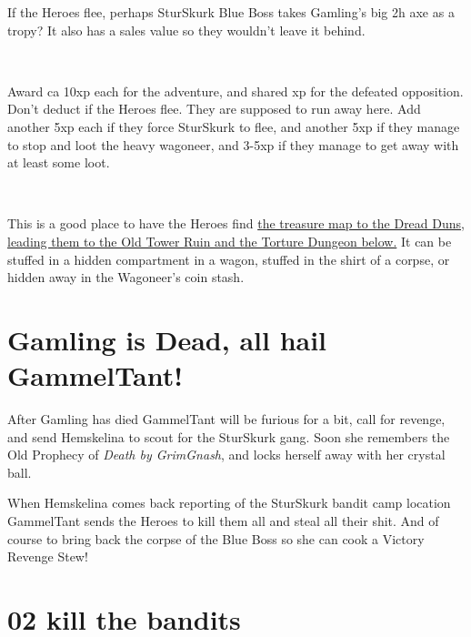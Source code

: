 If the Heroes flee, perhaps SturSkurk Blue Boss takes Gamling's big 2h axe as a tropy? It also has a sales value so they wouldn't leave it behind.

\

Award ca 10xp each for the adventure, and shared xp for the defeated opposition. Don't deduct if the Heroes flee. They are supposed to run away here. Add another 5xp each if they force SturSkurk to flee, and another 5xp if they manage to stop and loot the heavy wagoneer, and 3-5xp if they manage to get away with at least some loot.

\

This is a good place to have the Heroes find  
\hyperref[xxtorturedungeon]{the treasure map to the Dread Duns, leading them to the Old Tower Ruin and the Torture Dungeon below.} 
It can be stuffed in a hidden compartment in a wagon, stuffed in the shirt of a corpse, or hidden away in the Wagoneer's coin stash.





\vfill
{}
\section*{Gamling is Dead, all hail GammelTant!}

After Gamling has died GammelTant will be furious for a bit, call for revenge, and send Hemskelina to scout for the SturSkurk gang. Soon she remembers the Old Prophecy of \emph{Death by GrimGnash}, and locks herself away with her crystal ball.

When Hemskelina comes back reporting of the SturSkurk bandit camp location GammelTant sends the Heroes to kill them all and steal all their shit. And of course to bring back the corpse of the Blue Boss so she can cook a Victory Revenge Stew!










\clearpage
\section*{02 kill the bandits}
\label{02killthebandits}

